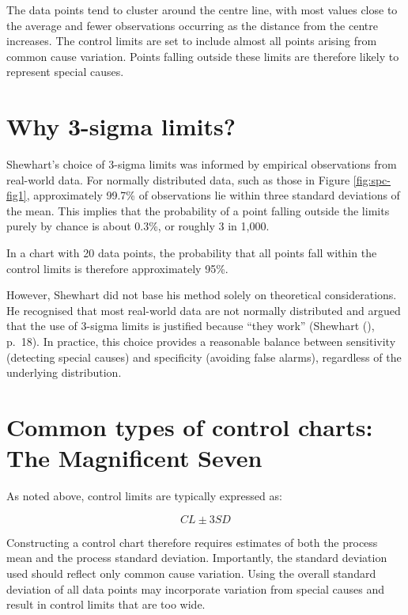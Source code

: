 \documentclass[
]{book}
\begin{document}
The data points tend to cluster around the centre line, with most values close to the average and fewer observations occurring as the distance from the centre increases. The control limits are set to include almost all points arising from common cause variation. Points falling outside these limits are therefore likely to represent special causes.

\section{Why 3-sigma limits?}\label{why-3-sigma-limits}

Shewhart's choice of 3-sigma limits was informed by empirical observations from real-world data. For normally distributed data, such as those in Figure \ref{fig:spc-fig1}, approximately 99.7\% of observations lie within three standard deviations of the mean. This implies that the probability of a point falling outside the limits purely by chance is about 0.3\%, or roughly 3 in 1,000.

In a chart with 20 data points, the probability that all points fall within the control limits is therefore approximately 95\%.

However, Shewhart did not base his method solely on theoretical considerations. He recognised that most real-world data are not normally distributed and argued that the use of 3-sigma limits is justified because ``they work'' (Shewhart (), p.~18). In practice, this choice provides a reasonable balance between sensitivity (detecting special causes) and specificity (avoiding false alarms), regardless of the underlying distribution.

\section{Common types of control charts: The Magnificent Seven}\label{common-types-of-control-charts-the-magnificent-seven}

As noted above, control limits are typically expressed as:

\[CL \pm 3SD\]

Constructing a control chart therefore requires estimates of both the process mean and the process standard deviation. Importantly, the standard deviation used should reflect only common cause variation. Using the overall standard deviation of all data points may incorporate variation from special causes and result in control limits that are too wide.
\end{document}
